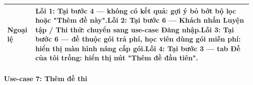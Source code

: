 \begin{longtable}{|p{3.2cm}|p{\dimexpr\linewidth-3.2cm-4\tabcolsep-3\arrayrulewidth\relax}|}
\textbf{Ngoại lệ} & \textbf{Lỗi 1:} Tại bước 4 --- không có kết quả: gợi ý bỏ bớt bộ lọc hoặc "Thêm đề này".\newline \textbf{Lỗi 2:} Tại bước 6 --- Khách nhấn Luyện tập / Thi thử: chuyển sang use-case Đăng nhập.\newline \textbf{Lỗi 3:} Tại bước 6 --- đề thuộc gói trả phí, học viên dùng gói miễn phí: hiển thị màn hình nâng cấp gói.\newline \textbf{Lỗi 4:} Tại bước 3 --- tab Đề của tôi trống: hiển thị nút "Thêm đề đầu tiên". \\ \hline
\end{longtable}
\endgroup


\paragraph{Use-case 7: Thêm đề thi}


